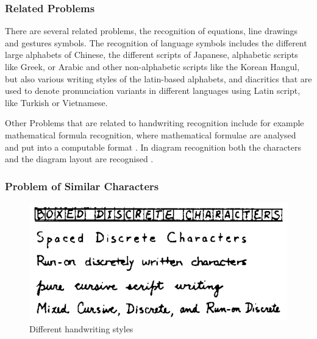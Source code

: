 \subsubsection{Related Problems}
\label{sec:relatedproblems}

There are several related problems, the recognition of equations, line 
drawings and gestures symbols. The recognition of language symbols includes 
the different large alphabets of Chinese, the different scripts of Japanese, 
alphabetic scripts like Greek, or Arabic and other non-alphabetic scripts like
the Korean  Hangul, but also various writing styles of the latin-based 
alphabets, and diacritics that are used to denote pronunciation variants in 
different languages using Latin script, like Turkish or Vietnamese.

Other Problems that are related to handwriting recognition include for example
mathematical formula recognition, where mathematical formulae are analysed and 
put into a computable format . In diagram recognition 
both the characters and the diagram layout are recognised 
.

\subsubsection{Problem of Similar Characters}
\label{sec:similarcharacters}

\begin{figure}[htbp]
\begin{center}
\includegraphics[scale=0.5]{images/differentHandwritingStyles.png}
\caption{Different handwriting styles}
\label{fig:differenthandwritingstyles}
\end{center}
\end{figure}


